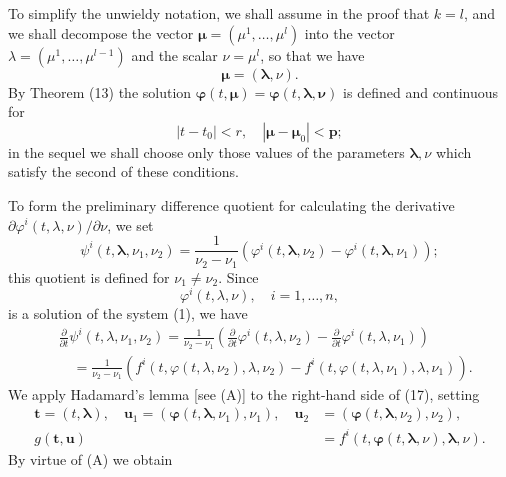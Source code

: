 \documentclass[10pt,a5paper]{book}
\makeatletter
\theoremstyle{plain}
\theoremstyle{definition}
\theoremstyle{remark}
\renewenvironment{proof}[1][\proofname]{\par
  \pushQED{\qed}%
  \normalfont\topsep6\p@\@plus6\p@\relax
  \trivlist
  \item\relax{\itshape #1\@addpunct{.}}\hspace\labelsep\ignorespaces
}{\popQED\endtrivlist\@endpefalse}
\makeatother
\begin{document}
\begin{proof}
To simplify the unwieldy notation, we shall assume in the proof that $k=l$, and we shall decompose the vector $\boldsymbol{\mu}=\left(\mu^{1}, \ldots, \mu^{l}\right)$ into the vector $\lambda=\left(\mu^{1}, \ldots, \mu^{l-1}\right)$ and the scalar $\nu=\mu^{l}$, so that we have
\[
\boldsymbol{\mu}=(\mathbf{\lambda}, \nu) .
\]
By Theorem (13) the solution $\boldsymbol{\varphi}(t, \boldsymbol{\mu})=\boldsymbol{\varphi}(t, \boldsymbol{\lambda}, \boldsymbol{\nu})$ is defined and continuous for
\[
\left|t-t_{0}\right|<r, \quad\left|\boldsymbol{\mu}-\boldsymbol{\mu}_{0}\right|<\boldsymbol{p} ;
\]
in the sequel we shall choose only those values of the parameters $\boldsymbol{\lambda}, \nu$ which satisfy the second of these conditions.

To form the preliminary difference quotient for calculating the derivative $\partial \varphi^{i}(t, \lambda, \nu) / \partial \nu$, we set
\[
\psi^{i}\left(t, \mathbf{\lambda}, \nu_{1}, \nu_{2}\right)=\frac{1}{\nu_{2}-\nu_{1}}\left(\varphi^{i}\left(t, \mathbf{\lambda}, \nu_{2}\right)-\varphi^{i}\left(t, \mathbf{\lambda}, \nu_{1}\right)\right) ;
\]
this quotient is defined for $\nu_{1} \neq \nu_{2}$. Since
\[
\varphi^{i}(t, \lambda, \nu), \quad i=1, \ldots, n,
\]
is a solution of the system (1), we have
\begin{align*}
& \frac{\partial}{\partial t} \psi^{i}\left(t, \lambda, \nu_{1}, \nu_{2}\right)=\frac{1}{\nu_{2}-\nu_{1}}\left(\frac{\partial}{\partial t} \varphi^{i}\left(t, \lambda, \nu_{2}\right)-\frac{\partial}{\partial t} \varphi^{i}\left(t, \lambda, \nu_{1}\right)\right) \\
& \quad=\frac{1}{\nu_{2}-\nu_{1}}\left(f^{i}\left(t, \varphi\left(t, \lambda, \nu_{2}\right), \lambda, \nu_{2}\right)-f^{i}\left(t, \varphi\left(t, \lambda, \nu_{1}\right), \lambda, \nu_{1}\right)\right) . \tag{17}
\end{align*}
We apply Hadamard's lemma [see (A)] to the right-hand side of (17), setting
\[
\begin{aligned}
\mathbf{t}=(t, \mathbf{\lambda}), \quad \mathbf{u}_{1}=\left(\boldsymbol{\varphi}\left(t, \mathbf{\lambda}, \nu_{1}\right), \nu_{1}\right), \quad \mathbf{u}_{2} & =\left(\boldsymbol{\varphi}\left(t, \mathbf{\lambda}, \nu_{2}\right), \nu_{2}\right), \\
g(\mathbf{t}, \mathbf{u}) & =f^{i}(t, \boldsymbol{\varphi}(t, \mathbf{\lambda}, \nu), \mathbf{\lambda}, \nu) .
\end{aligned}
\]
By virtue of (A) we obtain
\[
\begin{aligned}

\end{aligned}\]
\end{proof}
\end{document}
